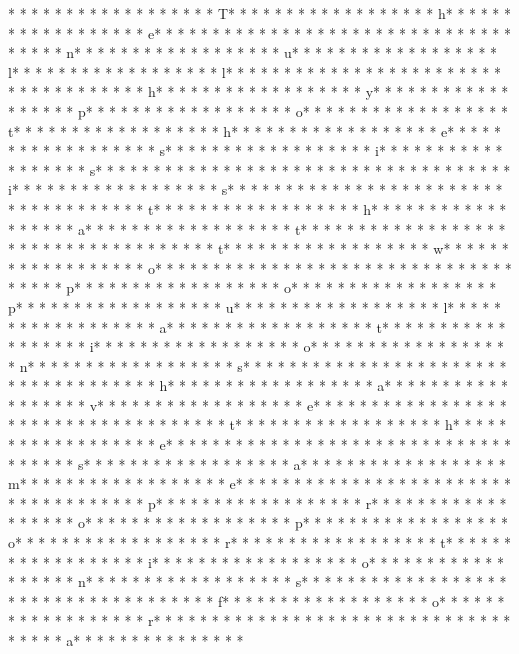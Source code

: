 * * *  * * *  * * *  *  * * *  *  * * *  * T* * *  * * *  * * *  *  * * *  *  * * *  * h* * *  * * *  * * *  *  * * *  *  * * *  * e* * *  * * *  * * *  *  * * *  *  * * *  *  * * *  * * *  * * *  *  * * *  *  * * *  * n* * *  * * *  * * *  *  * * *  *  * * *  * u* * *  * * *  * * *  *  * * *  *  * * *  * l* * *  * * *  * * *  *  * * *  *  * * *  * l* * *  * * *  * * *  *  * * *  *  * * *  *  * * *  * * *  * * *  *  * * *  *  * * *  * h* * *  * * *  * * *  *  * * *  *  * * *  * y* * *  * * *  * * *  *  * * *  *  * * *  * p* * *  * * *  * * *  *  * * *  *  * * *  * o* * *  * * *  * * *  *  * * *  *  * * *  * t* * *  * * *  * * *  *  * * *  *  * * *  * h* * *  * * *  * * *  *  * * *  *  * * *  * e* * *  * * *  * * *  *  * * *  *  * * *  * s* * *  * * *  * * *  *  * * *  *  * * *  * i* * *  * * *  * * *  *  * * *  *  * * *  * s* * *  * * *  * * *  *  * * *  *  * * *  *  * * *  * * *  * * *  *  * * *  *  * * *  * i* * *  * * *  * * *  *  * * *  *  * * *  * s* * *  * * *  * * *  *  * * *  *  * * *  *  * * *  * * *  * * *  *  * * *  *  * * *  * t* * *  * * *  * * *  *  * * *  *  * * *  * h* * *  * * *  * * *  *  * * *  *  * * *  * a* * *  * * *  * * *  *  * * *  *  * * *  * t* * *  * * *  * * *  *  * * *  *  * * *  *  * * *  * * *  * * *  *  * * *  *  * * *  * t* * *  * * *  * * *  *  * * *  *  * * *  * w* * *  * * *  * * *  *  * * *  *  * * *  * o* * *  * * *  * * *  *  * * *  *  * * *  *  * * *  * * *  * * *  *  * * *  *  * * *  * p* * *  * * *  * * *  *  * * *  *  * * *  * o* * *  * * *  * * *  *  * * *  *  * * *  * p* * *  * * *  * * *  *  * * *  *  * * *  * u* * *  * * *  * * *  *  * * *  *  * * *  * l* * *  * * *  * * *  *  * * *  *  * * *  * a* * *  * * *  * * *  *  * * *  *  * * *  * t* * *  * * *  * * *  *  * * *  *  * * *  * i* * *  * * *  * * *  *  * * *  *  * * *  * o* * *  * * *  * * *  *  * * *  *  * * *  * n* * *  * * *  * * *  *  * * *  *  * * *  * s* * *  * * *  * * *  *  * * *  *  * * *  *  * * *  * * *  * * *  *  * * *  *  * * *  * h* * *  * * *  * * *  *  * * *  *  * * *  * a* * *  * * *  * * *  *  * * *  *  * * *  * v* * *  * * *  * * *  *  * * *  *  * * *  * e* * *  * * *  * * *  *  * * *  *  * * *  *  * * *  * * *  * * *  *  * * *  *  * * *  * t* * *  * * *  * * *  *  * * *  *  * * *  * h* * *  * * *  * * *  *  * * *  *  * * *  * e* * *  * * *  * * *  *  * * *  *  * * *  *  * * *  * * *  * * *  *  * * *  *  * * *  * s* * *  * * *  * * *  *  * * *  *  * * *  * a* * *  * * *  * * *  *  * * *  *  * * *  * m* * *  * * *  * * *  *  * * *  *  * * *  * e* * *  * * *  * * *  *  * * *  *  * * *  *  * * *  * * *  * * *  *  * * *  *  * * *  * p* * *  * * *  * * *  *  * * *  *  * * *  * r* * *  * * *  * * *  *  * * *  *  * * *  * o* * *  * * *  * * *  *  * * *  *  * * *  * p* * *  * * *  * * *  *  * * *  *  * * *  * o* * *  * * *  * * *  *  * * *  *  * * *  * r* * *  * * *  * * *  *  * * *  *  * * *  * t* * *  * * *  * * *  *  * * *  *  * * *  * i* * *  * * *  * * *  *  * * *  *  * * *  * o* * *  * * *  * * *  *  * * *  *  * * *  * n* * *  * * *  * * *  *  * * *  *  * * *  * s* * *  * * *  * * *  *  * * *  *  * * *  *  * * *  * * *  * * *  *  * * *  *  * * *  * f* * *  * * *  * * *  *  * * *  *  * * *  * o* * *  * * *  * * *  *  * * *  *  * * *  * r* * *  * * *  * * *  *  * * *  *  * * *  *  * * *  * * *  * * *  *  * * *  *  * * *  * a* * *  * * *  * * *  *  * * *  *  * 
